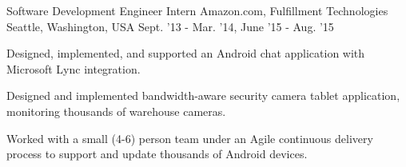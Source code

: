 \begin{cventries}
{\begin{cvitems}
        \end{cvitems}
    }
\vspace{3mm}
\cventry
    {Software Development Engineer Intern} %
    {Amazon.com, Fulfillment Technologies} %
    {Seattle, Washington, USA} %
    {Sept. '13 - Mar. '14,
    June '15 - Aug. '15} %
    {
        \begin{cvitems}
            \item Designed, implemented, and supported an Android chat application with Microsoft Lync integration.
            \item Designed and implemented bandwidth-aware security camera tablet application, monitoring thousands of warehouse cameras.
            \item Worked with a small (4-6) person team under an Agile continuous delivery process to support and update thousands of Android devices.
        \end{cvitems}
    }
\end{cventries}
